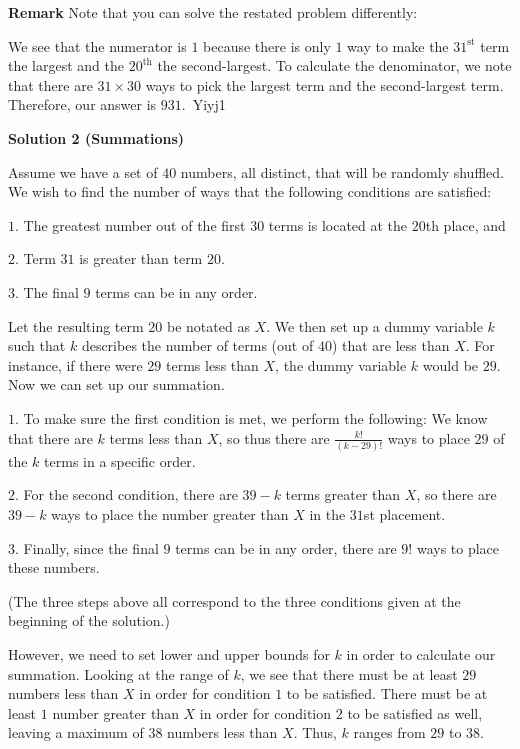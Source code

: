 \begin{enumerate}
 \textbf{Remark} Note that you can solve the restated problem differently: 

 We see that the numerator is $1$ because there is only $1$ way to make the $31^{\text{st}}$ term the largest and the $20^{\text{th}}$ the second-largest. To calculate the denominator, we note that there are $31\times30$ ways to pick the largest term and the second-largest term. Therefore, our answer is $\boxed{931}$.~Yiyj1

 



\textbf{Solution 2 (Summations)}

Assume we have a set of $40$ numbers, all distinct, that will be randomly shuffled. We wish to find the number of ways that the following conditions are satisfied:

 $1.$ The greatest number out of the first $30$ terms is located at the $20$th place, and

 $2.$ Term $31$ is greater than term $20$.

 $3.$ The final $9$ terms can be in any order.

 Let the resulting term $20$ be notated as $X$. We then set up a dummy variable $k$ such that $k$ describes the number of terms (out of $40$) that are less than $X$. For instance, if there were $29$ terms less than $X$, the dummy variable $k$ would be $29$. Now we can set up our summation.

 $1.$ To make sure the first condition is met, we perform the following: We know that there are $k$ terms less than $X$, so thus there are $\frac{k!}{(k-29)!}$ ways to place $29$ of the $k$ terms in a specific order.

 $2.$ For the second condition, there are $39-k$ terms greater than $X$, so there are $39-k$ ways to place the number greater than $X$ in the $31$st placement.

 $3.$ Finally, since the final $9$ terms can be in any order, there are $9!$ ways to place these numbers.

 (The three steps above all correspond to the three conditions given at the beginning of the solution.)

 However, we need to set lower and upper bounds for $k$ in order to calculate our summation. Looking at the range of $k$, we see that there must be at least $29$ numbers less than $X$ in order for condition $1$ to be satisfied. There must be at least $1$ number greater than $X$ in order for condition $2$ to be satisfied as well, leaving a maximum of $38$ numbers less than $X$. Thus, $k$ ranges from $29$ to $38$.


\end{enumerate}
